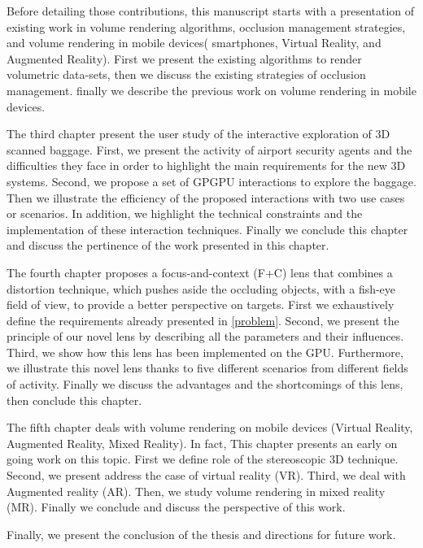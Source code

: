 Before detailing those contributions, this manuscript starts with a presentation of existing work in volume rendering algorithms, occlusion management strategies, and volume rendering in mobile devices( smartphones, Virtual Reality, and Augmented Reality). First we present the existing algorithms to render volumetric data-sets, then we discuss the existing strategies of occlusion management. finally we  describe the previous work on  volume rendering in mobile devices.


The third chapter present the user study of the interactive exploration of 3D scanned baggage. First, we present the activity of airport security agents and the difficulties they face in order to highlight the main requirements for the new 3D systems. Second, we propose a set of GPGPU interactions to explore the baggage. Then we illustrate the efficiency of the proposed interactions with two use cases or scenarios.
In addition, we highlight the technical constraints and  the implementation of these interaction techniques. Finally we conclude this chapter and discuss the pertinence of the work presented in this chapter.


The fourth chapter  proposes a focus-and-context (F+C) lens that combines a distortion technique, which pushes aside the occluding objects, with a fish-eye field of view, to provide a better perspective on targets. First we exhaustively define  the requirements already  presented in \autoref{problem}. Second, we present the principle of our novel lens by describing all the   parameters and their influences. Third, we show how this lens has been implemented on the GPU. Furthermore, we illustrate this novel lens thanks  to five different scenarios from different fields of activity. Finally we discuss the advantages and the shortcomings of this lens, then conclude this chapter.  


The fifth chapter deals with volume rendering on mobile devices (Virtual Reality, Augmented Reality, Mixed Reality). In fact, This chapter presents an early on going work on this topic. First we define role of the stereoscopic 3D technique. Second, we present address the case of virtual reality (VR). Third, we deal with Augmented reality (AR). Then, we study volume rendering in mixed reality (MR). Finally we conclude and discuss the perspective of this work.


Finally, we present the conclusion of the thesis and directions for future work.


